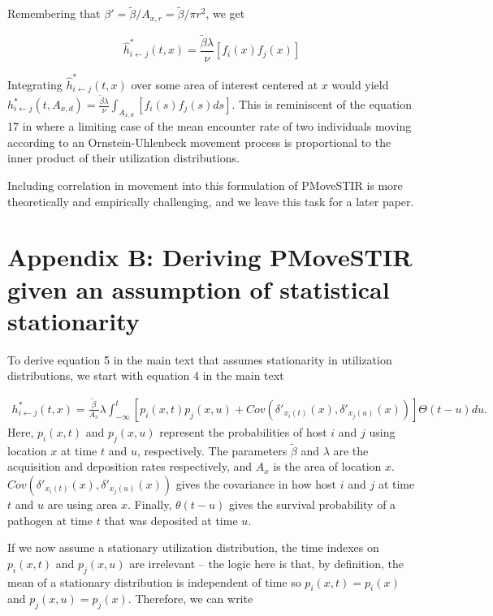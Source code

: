 \documentclass[11pt]{article}
\begin{document}
Remembering that $\beta' = \tilde{\beta} / A_{x, r} = \tilde{\beta} / \pi r^2$, we get 

\begin{equation}
    \hat{h}^*_{i \leftarrow j}(t, x) =  \frac{\tilde{\beta} \lambda}{\nu} [f_i(x) f_j(x)]
\end{equation}

Integrating $\hat{h}^*_{i \leftarrow j}(t, x)$ over some area of interest centered at $x$ would yield  $h^*_{i \leftarrow j}(t, A_{x, d}) = \frac{\tilde{\beta} \lambda}{\nu} \int_{A_{x, d}} [f_i(s) f_j(s) ds] $. This is reminiscent of the equation 17 in \cite{Martinez-Garcia2020} where a limiting case of the mean encounter rate of two individuals moving according to an Ornstein-Uhlenbeck movement process is proportional to the inner product of their utilization distributions. 

Including correlation in movement into this formulation of PMoveSTIR is more theoretically and empirically challenging, and we leave this task for a later paper.

\section*{Appendix B: Deriving PMoveSTIR given an assumption of statistical stationarity}

To derive equation 5 in the main text that assumes stationarity in utilization distributions, we start with equation 4 in the main text

\begin{equation}
    \begin{aligned}
        h^*_{i \leftarrow j}(t, x) = \frac{\tilde{\beta}}{A_x} \lambda \int_{-\infty}^{t} [p_i(x, t) p_j(x, u) + Cov(\delta'_{x_i(t)}(x), \delta'_{x_j(u)}(x))] \Theta(t - u) du.
    \end{aligned}
    \label{eq:foi_cov}
\end{equation}
Here, $p_i(x, t)$ and $p_j(x, u)$ represent the probabilities of host $i$ and $j$ using location $x$ at time $t$ and $u$, respectively. The parameters $\tilde{\beta}$ and $\lambda$ are the acquisition and deposition rates respectively, and $A_x$ is the area of location $x$.  $Cov(\delta'_{x_i(t)}(x), \delta'_{x_j(u)}(x))$ gives the covariance in how host $i$ and $j$ at time $t$ and $u$ are using area $x$.  Finally, $\theta(t - u)$  gives the survival probability of a pathogen at time $t$ that was deposited at time $u$. 

If we now assume a stationary utilization distribution, the time indexes on $p_i(x, t)$ and $p_j(x, u)$ are irrelevant -- the logic here is that, by definition, the mean of a stationary distribution is independent of time so $p_i(x, t) = p_i(x)$ and $p_j(x, u) = p_j(x)$. Therefore, we can write  
\end{document}
